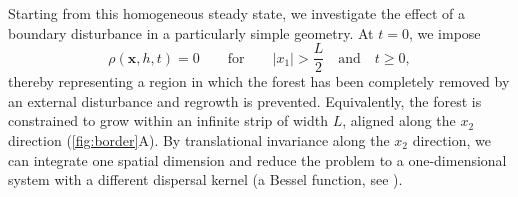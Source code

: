 \documentclass[aps,pre,twocolumn,superscriptaddress,10pt]{revtex4-2}
\begin{document}
Starting from this homogeneous steady state, we investigate the effect of a boundary disturbance in a particularly simple geometry. At $t=0$, we impose
\begin{equation}
\rho(\mathbf{x},h,t)=0 \qquad \text{for} \qquad |x_1|>\frac{L}{2}\quad\text{and}\quad t\geq0,
\label{eq:forest-strip}
\end{equation}
thereby representing a region in which the forest has been completely removed by an external disturbance and regrowth is prevented. Equivalently, the forest is constrained to grow within an infinite strip of width $L$, aligned along the $x_2$ direction (\cref{fig:border}A).
By translational invariance along the $x_2$ direction, we can integrate one spatial dimension and reduce the problem to a one-dimensional system with a different dispersal kernel (a Bessel function, see \MM).
\end{document}
